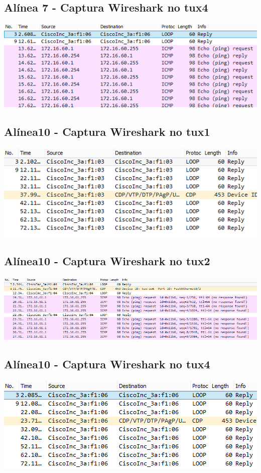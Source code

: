 \documentclass[11pt,a4paper,reqno]{report}
\numberwithin{equation}{section}
\begin{document}
\begin{appendices}
\subsection{Alínea 7 - Captura Wireshark no tux4}
\label{ex2_tux1ping_tux4}
\includegraphics[width=16cm]{ex2_a7_tux4.png}

\subsection{Alínea10 - Captura Wireshark no tux1}
\includegraphics[width=16cm]{ex2_a10_tux1.png}
\subsection{Alínea10 - Captura Wireshark no tux2}
\includegraphics[width=16cm]{ex2_a10_tux2.png}
\subsection{Alínea10 - Captura Wireshark no tux4}
\includegraphics[width=16cm]{ex2_a10_tux4.png}


\end{appendices}
\end{document}
